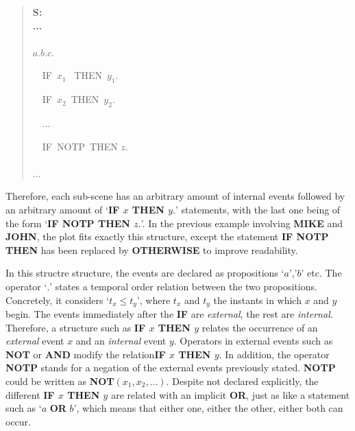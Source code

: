 \documentclass[
		twoside,openright,titlepage,numbers=noenddot,manychapters,
		headinclude,%
                footinclude=false,cleardoublepage=empty,
                BCOR=5mm,
		fontsize=11pt, %
                 enabledeprecatedfontcommands]{scrreprt}
\begin{document}
\begin{quote}
{\bf
S: \\
...\\
\\
$a. b. c. $

\ \	IF\ $x_1$ \ THEN\ $y_1.$

\ \	IF\ $x_2$\ THEN\ $y_2.$

\ \	...

\ \	IF\ NOTP\ THEN $z$.\\
\\
 ...

}
\end{quote}







Therefore, each sub-scene has an arbitrary amount of internal events followed by an arbitrary amount of ‘\textbf{IF $x$ THEN $y.$}’ statements, with the last one being of the form ‘\textbf{IF NOTP THEN $z.$}’. In the previous example involving \textbf{MIKE} and \textbf{JOHN}, the plot fits exactly this structure, except the statement  \textbf{ IF NOTP THEN} has been replaced by \textbf{OTHERWISE} to improve readability.


In this structre structure, the events are declared as propositions ‘$a$’,’$b$’ etc. The operator `$.$' states a temporal order relation between the two propositions. Concretely, it considers  `$t_x \leq t_y$', where $t_x$ and $t_y$ the instants in which $x$ and $y$ begin. The events immediately after the \textbf{IF} are \emph{external}, the rest are \emph{internal}. Therefore, a structure such as \textbf{IF $x$ THEN $y$} relates the occurrence of an \emph{external} event $x$ and an \emph{internal} event $y$. Operators in external events such as \textbf{NOT} or \textbf{AND} modify the relation\textbf{IF $x$ THEN $y$}. In addition, the operator \textbf{NOTP} stands for a negation of the external events previously stated. \textbf{NOTP} could be written as \textbf{NOT}$(x_1,x_2,...)$.  Despite not declared explicitly, the different \textbf{IF $x$ THEN $y$} are related with an implicit \textbf{OR}, just as like a statement such as `$a$ \textbf{OR} $b$', which means that either one, either the other, either both can occur.
\end{document}
